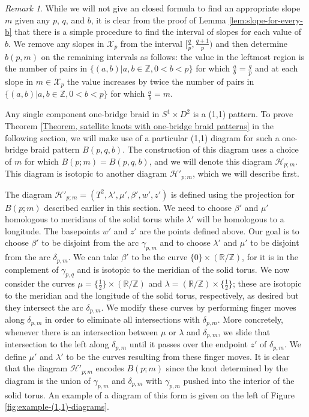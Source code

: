 \documentclass{amsart}
\newcommand{\Z}{\mathbb{Z}}
\newcommand{\R}{\mathbb{R}}
\theoremstyle{definition}
\theoremstyle{remark}
\newtheorem{rmk}[thm]{Remark}
\numberwithin{equation}{section}
\numberwithin{equation}{section} \makeatletter
\begin{document}
\begin{rmk}
While we will not give an closed formula to find an appropriate slope $m$ given any $p$, $q$, and $b$, it is clear from the proof of Lemma \ref{lem:slope-for-every-b} that there is a simple procedure to find the interval of slopes for each value of $b$. We remove any slopes in $\mathcal{X}_p$ from the interval $[\frac{q}{p}, \frac{q+1}{p})$ and then determine $b(p,m)$ on the remaining intervals as follows: the value in the leftmost region is the number of pairs in $\{(a,b) | a,b \in \Z, 0<b<p\}$ for which $\frac a b = \frac q p$ and at each slope in $m \in \mathcal{X}_p$ the value increases by twice the number of pairs in $\{(a,b) | a,b \in \Z, 0<b<p\}$ for which $\frac a b = m$. 
\end{rmk}

 Any single component one-bridge braid in $S^1 \times D^2$ is a (1,1) pattern. To prove Theorem \ref{Theorem, satellite knots with one-bridge braid patterns} in the following section, we will make use of a particular (1,1) diagram for such a one-bridge braid pattern $B(p,q,b)$. The construction of this diagram uses a choice of $m$ for which $B(p; m) = B(p,q,b)$, and we will denote this diagram $\mathcal{H}_{p;m}$. This diagram is isotopic to another diagram $\mathcal{H}'_{p;m}$, which we will describe first.
 
 The diagram $\mathcal{H}'_{p;m} = (T^2, \lambda', \mu', \beta', w', z')$ is defined using the projection for $B(p;m)$ described earlier in this section. We need to choose $\beta'$ and $\mu'$ homologous to meridians of the solid torus while $\lambda'$ will be homologous to a longitude. The basepoints $w'$ and $z'$ are the points defined above. Our goal is to choose $\beta'$ to be disjoint from the arc $\gamma_{p,m}$ and to choose $\lambda'$ and $\mu'$ to be disjoint from the arc $\delta_{p,m}$. We can take $\beta'$ to be the curve $\{0\}\times (\R/\Z)$, for it is in the complement of $\gamma_{p,q}$ and is isotopic to the meridian of the solid torus. We now consider the curves $\mu = \{\frac 1 2\}\times(\R/\Z)$ and $\lambda = (\R/\Z)\times\{\frac 1 2\}$; these are isotopic to the meridian and the longitude of the solid torus, respectively, as desired but they intersect the arc $\delta_{p,m}$. We modify these curves by performing finger moves along $\delta_{p,m}$ in order to eliminate all intersections with $\delta_{p,m}$. More concretely, whenever there is an intersection between $\mu$ or $\lambda$ and $\delta_{p,m}$, we slide that intersection to the left along $\delta_{p,m}$ until it passes over the endpoint $z'$ of $\delta_{p,m}$. We define $\mu'$ and $\lambda'$ to be the curves resulting from these finger moves. It is clear that the diagram $\mathcal{H}'_{p;m}$ encodes $B(p;m)$ since the knot determined by the diagram is the union of $\gamma_{p,m}$ and $\delta_{p,m}$ with $\gamma_{p,m}$ pushed into the interior of the solid torus. An example of a diagram of this form is given on the left of Figure \ref{fig:example-(1,1)-diagrams}.
 
\end{document}
